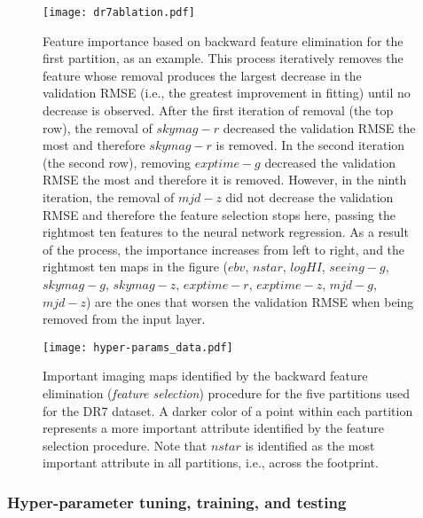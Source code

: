 \documentclass[fleqn, usenatbib]{mnras}
\begin{document}
\begin{figure}
    \centering
    \texttt{[image: dr7ablation.pdf]}
    \caption{Feature importance based on backward feature elimination for the first partition, as an example. This process iteratively removes the feature whose removal produces the largest decrease in the validation RMSE (i.e., the greatest improvement in fitting) until no decrease is observed. After the first iteration of removal (the top row), the removal of $skymag-r$ decreased the validation RMSE the most and therefore $skymag-r$ is removed. In the second iteration (the second row), removing $exptime-g$ decreased the validation RMSE the most and therefore it is removed. However, in the ninth iteration, the removal of $mjd-z$ did not decrease the validation RMSE and therefore the feature selection stops here, passing the rightmost ten features to the neural network regression. As a result of the process, the importance increases from left to right, and the rightmost ten maps in the figure ($ebv$, $nstar$, $logHI$, $seeing-g$, $skymag-g$, $skymag-z$, $exptime-r$, $exptime-z$, $mjd-g$, $mjd-z$) are the ones that worsen the validation RMSE when being removed from the input layer.}
    \label{fig:dr7ablation}
\end{figure}

\begin{figure}
    \centering
    \texttt{[image: hyper-params\_data.pdf]}
    \caption{Important imaging maps identified by the backward feature elimination (\textit{feature selection}) procedure for the five partitions used for the DR7 dataset. A darker color of a point within each partition represents a more important attribute identified by the feature selection procedure. Note that $nstar$ is identified as the most important attribute in all partitions, i.e., across the footprint.}
    \label{fig:dr7ablation2}
\end{figure}
 

\subsubsection{Hyper-parameter tuning, training, and testing}
\end{document}
